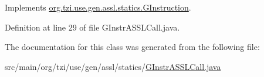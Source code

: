 Implements \hyperlink{interfaceorg_1_1tzi_1_1use_1_1gen_1_1assl_1_1statics_1_1_g_instruction_a2ce478cb4d7c839fec6db330099638a9}{org.\-tzi.\-use.\-gen.\-assl.\-statics.\-G\-Instruction}.



Definition at line 29 of file G\-Instr\-A\-S\-S\-L\-Call.\-java.



The documentation for this class was generated from the following file\-:\begin{DoxyCompactItemize}
\item 
src/main/org/tzi/use/gen/assl/statics/\hyperlink{_g_instr_a_s_s_l_call_8java}{G\-Instr\-A\-S\-S\-L\-Call.\-java}\end{DoxyCompactItemize}
